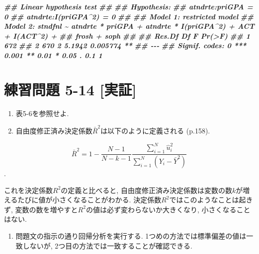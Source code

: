 \documentclass[
]{book}
\newenvironment{Shaded}{\begin{snugshade}}{\end{snugshade}}
\newcommand{\DocumentationTok}[1]{\textcolor[rgb]{0.56,0.35,0.01}{\textbf{\textit{#1}}}}
\providecommand{\tightlist}{%
  \setlength{\itemsep}{0pt}\setlength{\parskip}{0pt}}
\begin{document}
\begin{Shaded}
\begin{Highlighting}[]
\DocumentationTok{\#\# Linear hypothesis test}
\DocumentationTok{\#\# }
\DocumentationTok{\#\# Hypothesis:}
\DocumentationTok{\#\# atndrte:priGPA = 0}
\DocumentationTok{\#\# atndrte:I(priGPA\^{}2) = 0}
\DocumentationTok{\#\# }
\DocumentationTok{\#\# Model 1: restricted model}
\DocumentationTok{\#\# Model 2: stndfnl \textasciitilde{} atndrte * priGPA + atndrte * I(priGPA\^{}2) + ACT + I(ACT\^{}2) + }
\DocumentationTok{\#\#     frosh + soph}
\DocumentationTok{\#\# }
\DocumentationTok{\#\#   Res.Df Df      F   Pr(\textgreater{}F)   }
\DocumentationTok{\#\# 1    672                      }
\DocumentationTok{\#\# 2    670  2 5.1942 0.005774 **}
\DocumentationTok{\#\# {-}{-}{-}}
\DocumentationTok{\#\# Signif. codes:  0 \textquotesingle{}***\textquotesingle{} 0.001 \textquotesingle{}**\textquotesingle{} 0.01 \textquotesingle{}*\textquotesingle{} 0.05 \textquotesingle{}.\textquotesingle{} 0.1 \textquotesingle{} \textquotesingle{} 1}
\end{Highlighting}
\end{Shaded}

\hypertarget{ux7df4ux7fd2ux554fux984c-5-14-ux5b9fux8a3c}{%
\section*{練習問題 5-14 {[}実証{]}}\label{ux7df4ux7fd2ux554fux984c-5-14-ux5b9fux8a3c}}

\begin{enumerate}
\def\labelenumi{\alph{enumi}.}
\item
  表5-6を参照せよ.
\item
  自由度修正済み決定係数\(\bar{R}^2\)は以下のように定義される (p.158).
\end{enumerate}

\[\bar{R}^2 = 1 - \frac{N-1}{N-k-1}\frac{\sum_{i=1}^N\hat{u}_i^2}{\sum_{i=1}^N(Y_i-\bar{Y}^2)}\].

これを決定係数\(R^2\)の定義と比べると, 自由度修正済み決定係数は変数の数\(k\)が増えるたびに値が小さくなることがわかる. 決定係数\(R^2\)ではこのようなことは起きず, 変数の数を増やすと\(R^2\)の値は必ず変わらないか大きくなり, 小さくなることはない.

\begin{enumerate}
\def\labelenumi{\alph{enumi}.}
\setcounter{enumi}{2}
\tightlist
\item
  問題文の指示の通り回帰分析を実行する. 1つめの方法では標準偏差の値は一致しないが, 2つ目の方法では一致することが確認できる.
\end{enumerate}
\end{document}
